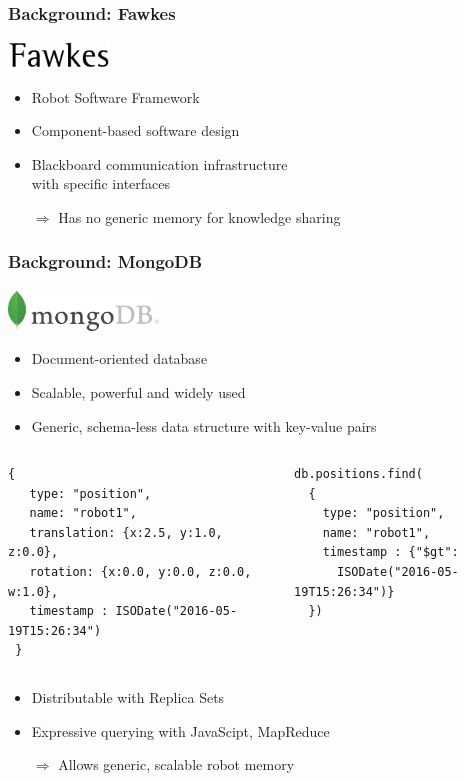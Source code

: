 \begin{frame}
  \frametitle{Background: Fawkes}
  \includegraphics[width=0.2\textwidth]{../img/fawkes}  
  \begin{itemize}
    \item Robot Software Framework
    \item Component-based software design
    \item Blackboard communication infrastructure\\ with specific interfaces
    \item[$\Rightarrow$] Has no generic memory for knowledge sharing
  \end{itemize}
\end{frame}

\begin{frame}[fragile]
  \frametitle{Background: MongoDB}
  \includegraphics[width=0.3\textwidth]{../img/mongodb}
  \begin{itemize}
    \item Document-oriented database
    \item Scalable, powerful and widely used
    \item Generic, schema-less data structure with key-value pairs
  \end{itemize}
\begin{columns}
\begin{lstlisting}[style=ReallySmallJSON,
  framexleftmargin=2pt, xleftmargin=2pt,
 morekeywords={}, numbers=none]
 {
   type: "position",
   name: "robot1",
   translation: {x:2.5, y:1.0, z:0.0},
   rotation: {x:0.0, y:0.0, z:0.0, w:1.0},
   timestamp : ISODate("2016-05-19T15:26:34")
 }
\end{lstlisting}
\begin{lstlisting}[style=ReallySmallJSON,
  framexleftmargin=2pt, xleftmargin=10pt,
 morekeywords={}, numbers=none]
db.positions.find(
  {
    type: "position",
    name: "robot1",
    timestamp : {"$gt":
      ISODate("2016-05-19T15:26:34")}
  })
\end{lstlisting}
\end{columns}

  \begin{itemize}
    \item Distributable with Replica Sets
    \item Expressive querying with JavaScipt, MapReduce
    \item[$\Rightarrow$] Allows generic, scalable robot memory
  \end{itemize}
\end{frame}


